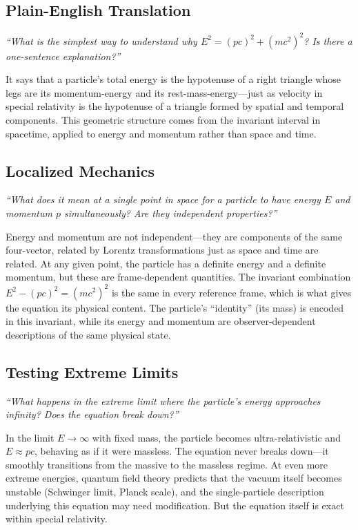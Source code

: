 \subsection*{Plain-English Translation}
\textit{``What is the simplest way to understand why $E^2 = (pc)^2 + (mc^2)^2$? Is there a one-sentence explanation?''}

It says that a particle's total energy is the hypotenuse of a right triangle whose legs are its momentum-energy and its rest-mass-energy---just as velocity in special relativity is the hypotenuse of a triangle formed by spatial and temporal components. This geometric structure comes from the invariant interval in spacetime, applied to energy and momentum rather than space and time.

\subsection*{Localized Mechanics}
\textit{``What does it mean at a single point in space for a particle to have energy $E$ and momentum $p$ simultaneously? Are they independent properties?''}

Energy and momentum are not independent---they are components of the same four-vector, related by Lorentz transformations just as space and time are related. At any given point, the particle has a definite energy and a definite momentum, but these are frame-dependent quantities. The invariant combination $E^2 - (pc)^2 = (mc^2)^2$ is the same in every reference frame, which is what gives the equation its physical content. The particle's ``identity'' (its mass) is encoded in this invariant, while its energy and momentum are observer-dependent descriptions of the same physical state.

\subsection*{Testing Extreme Limits}
\textit{``What happens in the extreme limit where the particle's energy approaches infinity? Does the equation break down?''}

In the limit $E \to \infty$ with fixed mass, the particle becomes ultra-relativistic and $E \approx pc$, behaving as if it were massless. The equation never breaks down---it smoothly transitions from the massive to the massless regime. At even more extreme energies, quantum field theory predicts that the vacuum itself becomes unstable (Schwinger limit, Planck scale), and the single-particle description underlying this equation may need modification. But the equation itself is exact within special relativity.


